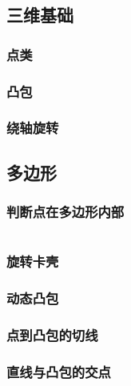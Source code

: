 \documentclass[a4paper]{article}
\newcommand{\cppcode}[1]{
    \inputminted[mathescape]{cpp}{source/#1}
}
\begin{document}
\cppcode{computational-geometry/closest-pair-of-points.cpp}

\subsection{三维基础}

\subsubsection{点类}

\subsubsection{凸包}

\subsubsection{绕轴旋转}

\subsection{多边形}

\subsubsection{判断点在多边形内部}

\cppcode{computational-geometry/point-in-polygon.cpp}

\subsubsection{旋转卡壳}

\subsubsection{动态凸包}

\subsubsection{点到凸包的切线}

\subsubsection{直线与凸包的交点}

\end{document}
